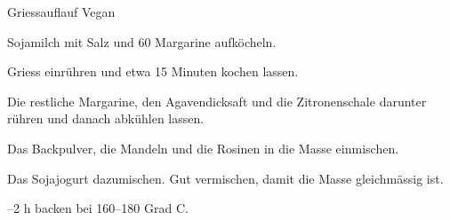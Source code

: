 
\begin{recipe}[]{Griessauflauf Vegan}{}{}



\step%
Sojamilch mit Salz und 60 \g Margarine aufk\"ocheln.

\step%
Griess einr\"uhren und etwa 15 Minuten kochen lassen.

\step%
Die restliche Margarine, den Agavendicksaft und die Zitronenschale darunter
r\"uhren und danach abk\"uhlen lassen.

\step%
Das Backpulver, die Mandeln und die Rosinen in die Masse einmischen.

\step%
Das Sojajogurt dazumischen. Gut vermischen, damit die Masse gleichm\"assig ist.

--2 h backen bei 160--180 Grad C.

\end{recipe}
